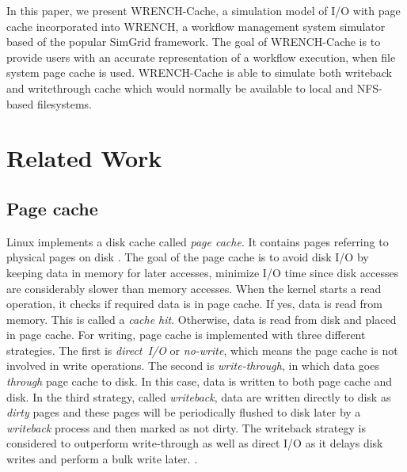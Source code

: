 \documentclass[conference]{IEEEtran}
\begin{document}
        In this paper, we present WRENCH-Cache, a simulation model of I/O with page
        cache incorporated into WRENCH, a workflow management system simulator based of
        the popular SimGrid framework. The goal of WRENCH-Cache is to provide users
        with an accurate representation of a workflow execution, when file system page
        cache is used. WRENCH-Cache is able to simulate both writeback and writethrough
        cache which would normally be available to local and NFS-based filesystems.

    \section{Related Work}        
    \label{relatedwork}    
        
        \subsection{Page cache}                            
            
            Linux implements a disk cache called \textit{page cache}. 
            It contains pages referring to physical pages on disk \cite{linuxdev3rd2010}.
            The goal of the page cache is to avoid disk I/O by keeping data in memory 
            for later accesses, minimize I/O time since disk accesses are considerably 
            slower than memory accesses.
            When the kernel starts a read operation, it checks if required data is in page cache.
            If yes, data is read from memory. This is called a \textit{cache hit}. 
            Otherwise, data is read from disk and placed in page cache.
            For writing, page cache is implemented with three different strategies. 
            The first is \textit{direct~I/O} or \textit{no-write}, which means the page cache 
            is not involved in write operations. 
            The second is \textit{write-through}, in which data goes \textit{through} 
            page cache to disk. In this case, data is written to both page cache and disk. 
            In the third strategy, called \textit{writeback}, data are written directly 
            to disk as \textit{dirty} pages and these pages will be periodically flushed 
            to disk later by a \textit{writeback} process and then marked as not dirty. 
            The writeback strategy is considered to outperform write-through as well as 
            direct I/O as it delays disk writes and perform a bulk write later.
            \cite{linuxdev3rd2010}. 
            
\end{document}
